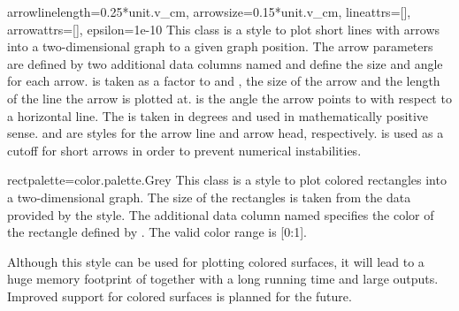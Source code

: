 \begin{classdesc}{arrow}{linelength=0.25*unit.v\_cm, %
                         arrowsize=0.15*unit.v\_cm,
                         lineattrs=[], arrowattrs=[],
                         epsilon=1e-10}
  This class is a style to plot short lines with arrows into a
  two-dimensional graph to a given graph position. The arrow
  parameters are defined by two additional data columns named
   and  define the size and angle for each
  arrow.  is taken as a factor to  and
  , the size of the arrow and the length of the line
  the arrow is plotted at.  is the angle the arrow points
  to with respect to a horizontal line. The  is taken in
  degrees and used in mathematically positive sense. 
  and  are styles for the arrow line and arrow head,
  respectively.  is used as a cutoff for short arrows in
  order to prevent numerical instabilities.
\end{classdesc} %

\begin{classdesc}{rect}{palette=color.palette.Grey} %
  This class is a style to plot colored rectangles into a
  two-dimensional graph. The size of the rectangles is taken from
  the data provided by the  style. The additional
  data column named  specifies the color of the rectangle
  defined by . The valid color range is [0:1].

  \begin{note}
    Although this style can be used for plotting colored surfaces, it
    will lead to a huge memory footprint of \PyX{} together with a
    long running time and large outputs. Improved support for colored
    surfaces is planned for the future.
  \end{note}
\end{classdesc} %

